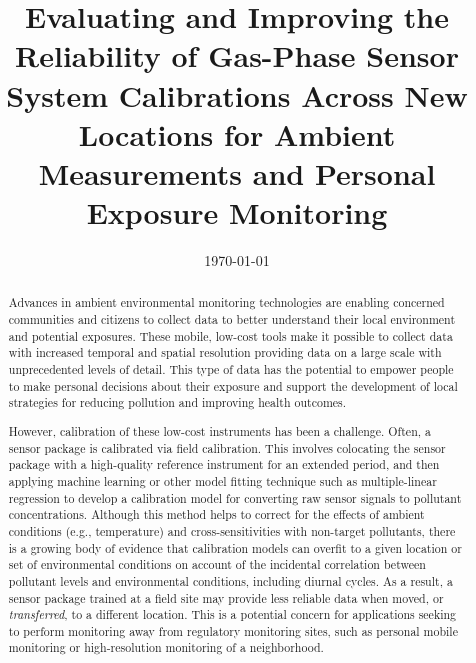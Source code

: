 \documentclass[journal abbreviation, manuscript]{copernicus}
\title{Evaluating and Improving the Reliability of Gas-Phase Sensor System Calibrations Across New Locations for Ambient Measurements and Personal Exposure Monitoring}
\date{\today}
\affil[1]{University of California, San Diego}
\affil[2]{University of Colorado, Boulder}
\begin{document}
\maketitle

\begin{abstract}

Advances in ambient environmental monitoring technologies are enabling concerned communities and citizens to collect data to better understand their local environment and potential exposures. These mobile, low-cost tools make it possible to collect data with increased temporal and spatial resolution providing data on a large scale with unprecedented levels of detail. This type of data has the potential to empower people to make personal decisions about their exposure and support the development of local strategies for reducing pollution and improving health outcomes.

However, calibration of these low-cost instruments has been a challenge.  Often, a sensor package is calibrated via field calibration. This involves colocating the sensor package with a high-quality reference instrument for an extended period, and then applying machine learning or other model fitting technique such as multiple-linear regression to develop a calibration model for converting raw sensor signals to pollutant concentrations.  Although this method helps to correct for the effects of ambient conditions (e.g., temperature) and cross-sensitivities with non-target pollutants, there is a growing body of evidence that calibration models can overfit to a given location or set of environmental conditions on account of the incidental correlation between pollutant levels and environmental conditions, including diurnal cycles.  As a result, a sensor package trained at a field site may provide less reliable data when moved, or \textit{transferred}, to a different location.  This is a potential concern for applications seeking to perform monitoring away from regulatory monitoring sites, such as personal mobile monitoring or high-resolution monitoring of a neighborhood.  





\end{abstract}
\end{document}
